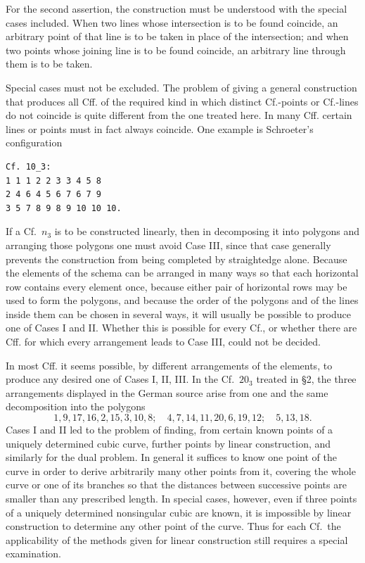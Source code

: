 \documentclass[11pt]{article}
\newcommand{\Cf}{\textup{Cf.}}
\begin{document}
For the second assertion, the construction must be understood with the special cases included. When two lines whose intersection is to be found coincide, an arbitrary point of that line is to be taken in place of the intersection; and when two points whose joining line is to be found coincide, an arbitrary line through them is to be taken.

Special cases must not be excluded. The problem of giving a general construction that produces all Cff. of the required kind in which distinct \Cf-points or \Cf-lines do not coincide is quite different from the one treated here. In many Cff. certain lines or points must in fact always coincide. One example is Schroeter's configuration
\small
\begin{verbatim}
Cf. 10_3:
1 1 1 2 2 3 3 4 5 8
2 4 6 4 5 6 7 6 7 9
3 5 7 8 9 8 9 10 10 10.
\end{verbatim}
\normalsize

If a \Cf\ $n_3$ is to be constructed linearly, then in decomposing it into polygons and arranging those polygons one must avoid Case III, since that case generally prevents the construction from being completed by straightedge alone. Because the elements of the schema can be arranged in many ways so that each horizontal row contains every element once, because either pair of horizontal rows may be used to form the polygons, and because the order of the polygons and of the lines inside them can be chosen in several ways, it will usually be possible to produce one of Cases I and II. Whether this is possible for every \Cf, or whether there are Cff. for which every arrangement leads to Case III, could not be decided.

In most Cff. it seems possible, by different arrangements of the elements, to produce any desired one of Cases I, II, III. In the \Cf\ $20_3$ treated in \S 2, the three arrangements displayed in the German source arise from one and the same decomposition into the polygons
\[
1,9,17,16,2,15,3,10,8;
\quad 4,7,14,11,20,6,19,12;
\quad 5,13,18.
\]
Cases I and II led to the problem of finding, from certain known points of a uniquely determined cubic curve, further points by linear construction, and similarly for the dual problem. In general it suffices to know one point of the curve in order to derive arbitrarily many other points from it, covering the whole curve or one of its branches so that the distances between successive points are smaller than any prescribed length. In special cases, however, even if three points of a uniquely determined nonsingular cubic are known, it is impossible by linear construction to determine any other point of the curve. Thus for each \Cf\ the applicability of the methods given for linear construction still requires a special examination.
\end{document}
